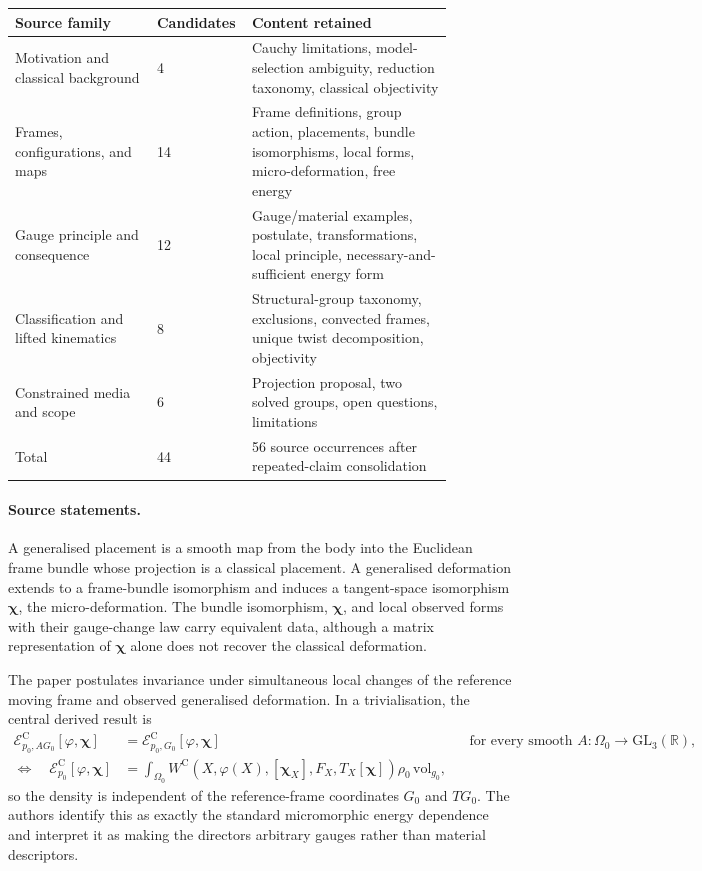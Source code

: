 \begin{center}
\begin{tabular}{p{0.31\linewidth}p{0.12\linewidth}p{0.44\linewidth}}
\hline
Source family & Candidates & Content retained \\
\hline
Motivation and classical background & 4 & Cauchy limitations, model-selection ambiguity, reduction taxonomy, classical objectivity \\
Frames, configurations, and maps & 14 & Frame definitions, group action, placements, bundle isomorphisms, local forms, micro-deformation, free energy \\
Gauge principle and consequence & 12 & Gauge/material examples, postulate, transformations, local principle, necessary-and-sufficient energy form \\
Classification and lifted kinematics & 8 & Structural-group taxonomy, exclusions, convected frames, unique twist decomposition, objectivity \\
Constrained media and scope & 6 & Projection proposal, two solved groups, open questions, limitations \\
\hline
Total & 44 & 56 source occurrences after repeated-claim consolidation \\
\hline
\end{tabular}
\end{center}

\paragraph{Source statements.}
A generalised placement is a smooth map from the body into the Euclidean frame bundle whose projection is a classical placement. A generalised deformation extends to a frame-bundle isomorphism and induces a tangent-space isomorphism $\boldsymbol\chi$, the micro-deformation. The bundle isomorphism, $\boldsymbol\chi$, and local observed forms with their gauge-change law carry equivalent data, although a matrix representation of $\boldsymbol\chi$ alone does not recover the classical deformation.

The paper postulates invariance under simultaneous local changes of the reference moving frame and observed generalised deformation. In a trivialisation, the central derived result is
\begin{align}
\mathcal E^{\mathrm C}_{p_0,A G_0}[\varphi,\boldsymbol\chi]
    &= \mathcal E^{\mathrm C}_{p_0,G_0}[\varphi,\boldsymbol\chi]
    &&\text{for every smooth }A:\Omega_0\to\mathrm{GL}_3(\mathbb R),\\
\Longleftrightarrow\quad
\mathcal E^{\mathrm C}_{p_0}[\varphi,\boldsymbol\chi]
    &= \int_{\Omega_0} W^{\mathrm C}
       (X,\varphi(X),[\boldsymbol\chi_X],F_X,T_X[\boldsymbol\chi])
       \rho_0\,\mathrm{vol}_{g_0},
\end{align}
so the density is independent of the reference-frame coordinates $G_0$ and $TG_0$. The authors identify this as exactly the standard micromorphic energy dependence and interpret it as making the directors arbitrary gauges rather than material descriptors.

